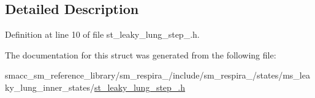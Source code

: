 \subsection{Detailed Description}


Definition at line 10 of file st\+\_\+leaky\+\_\+lung\+\_\+step\+\_.\+h.



The documentation for this struct was generated from the following file\+:\begin{DoxyCompactItemize}
\item 
smacc\+\_\+sm\+\_\+reference\+\_\+library/sm\+\_\+respira\+\_/include/sm\+\_\+respira\+\_/states/ms\+\_\+leaky\+\_\+lung\+\_\+inner\+\_\+states/\hyperlink{st__leaky__lung__step__2_8h}{st\+\_\+leaky\+\_\+lung\+\_\+step\+\_.\+h}\end{DoxyCompactItemize}
